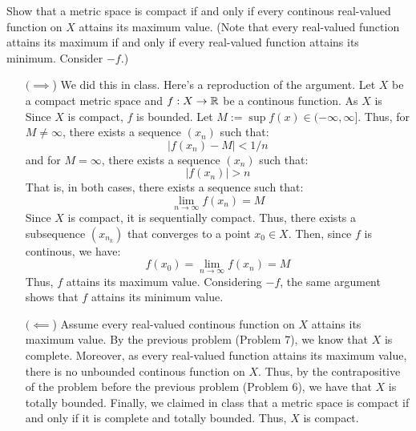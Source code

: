 \documentclass[12pt]{article}
\begin{document}
\begin{problab}{8}
    Show that a metric space is compact if and only if every continous real-valued function on $X$ attains its maximum value. (Note that every real-valued function attains its maximum if and only if every real-valued function attains its minimum. Consider $-f$.)
\end{problab}
\begin{solu}
    \bbni
    \begin{itemize}
        \item[$(\implies$)] We did this in class. Here's a reproduction of the argument. Let $X$ be a compact metric space and $f: X \to \mathbb R$ be a continous function. As $X$ is  Since $X$ is compact, $f$ is bounded.  Let $M := \sup f(x) \in (-\infty, \infty]$. Thus, for $M \neq \infty$, there exists a sequence $(x_n)$ such that: 
        \[ |f(x_n) - M| < 1/n\]
        and for $M = \infty$, there exists a sequence $(x_n)$ such that:
        \[|f(x_n)| > n\]
        That is, in both cases, there exists a sequence such that:
        \[\lim_{n \to \infty} f(x_n) = M \]
        Since $X$ is compact, it is sequentially compact. Thus, there exists a subsequence $(x_{n_k})$ that converges to a point $x_0 \in X$. \bbni 
        Then, since $f$ is continous, we have: 
        \[ f(x_0) = \lim_{n\to\infty} f(x_n) = M \]
        Thus, $f$ attains its maximum value. Considering $-f$, the same argument shows that $f$ attains its minimum value. 
        \item[$(\impliedby$)] Assume every real-valued continous function on $X$ attains its maximum value. By the previous problem (Problem 7), we know that $X$ is complete. Moreover, as every real-valued function attains its maximum value, there is no unbounded continous function on $X$. Thus, by the contrapositive of the problem before the previous problem (Problem 6), we have that $X$ is totally bounded. Finally, we claimed in class that a metric space is compact if and only if it is complete and totally bounded. Thus, $X$ is compact.        
    \end{itemize}
\end{solu}
\newpage 
\end{document}
